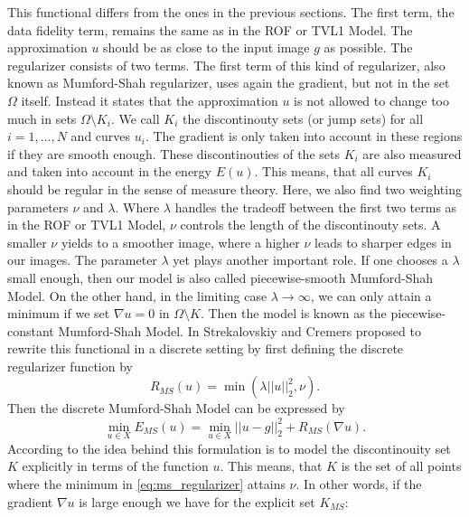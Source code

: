     This functional differs from the ones in the previous sections. The first term, the data fidelity term, remains the same as in the ROF or TVL1 Model. The approximation $u$ should be as close to the input image $g$ as possible. The regularizer consists of two terms. The first term of this kind of regularizer, also known as Mumford-Shah regularizer, uses again the gradient, but not in the set $\Omega$ itself. Instead it states that the approximation $u$ is not allowed to change too much in sets $\Omega \setminus K_{i}$. We call $K_{i}$ the discontinouty sets (or jump sets) for all $i = 1, ..., N$ and curves $u_{i}$. The gradient is only taken into account in these regions if they are smooth enough. These discontinouties of the sets $K_{i}$ are also measured and taken into account in the energy $E(u)$. This means, that all curves $K_{i}$ should be regular in the sense of measure theory. Here, we also find two weighting parameters $\nu$ and $\lambda$. Where $\lambda$ handles the tradeoff between the first two terms as in the ROF or TVL1 Model, $\nu$ controls the length of the discontinouty sets. A smaller $\nu$ yields to a smoother image, where a higher $\nu$ leads to sharper edges in our images. The parameter $\lambda$ yet plays another important role. If one chooses a $\lambda$ small enough, then our model is also called piecewise-smooth Mumford-Shah Model. On the other hand, in the limiting case $\lambda \longrightarrow \infty$, we can only attain a minimum if we set $\nabla u = 0$ in $\Omega \setminus K$. Then the model is known as the piecewise-constant Mumford-Shah Model.
    In \cite{Strekalovskiy-Cremers-eccv14} Strekalovskiy and Cremers proposed to rewrite this functional in a discrete setting by first defining the discrete regularizer function by
        \begin{equation}
            R_{MS}(u) = \min(\lambda||u||_{2}^{2},\nu).
        \label{eq:ms_regularizer}
        \end{equation}
    Then the discrete Mumford-Shah Model can be expressed by
        \begin{equation}
            \min_{u \in X} E_{MS}(u) = \min_{u \in X} ||u - g||_{2}^{2} + R_{MS}(\nabla u).
        \label{eq:discrete_mumford_shah_functional}
        \end{equation}
    According to \cite{Strekalovskiy-Cremers-eccv14} the idea behind this formulation is to model the discontinouity set $K$ explicitly in terms of the function $u$. This means, that $K$ is the set of all points where the minimum in \ref{eq:ms_regularizer} attains $\nu$. In other words, if the gradient $\nabla u$ is large enough we have for the explicit set $K_{MS}$:
